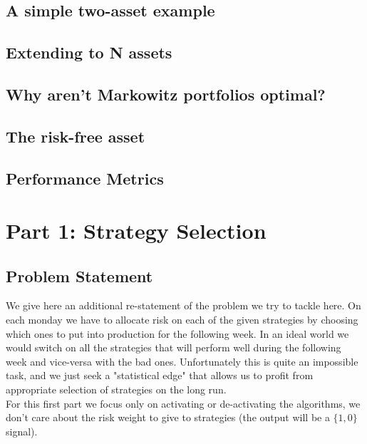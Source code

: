 \documentclass[12pt]{article} %
\numberwithin{equation}{subsection}
\begin{document}


\subsection{A simple two-asset example}



\subsection{Extending to N assets}




\subsection{Why aren't Markowitz portfolios optimal?}




\subsection{The risk-free asset}




\subsection{Performance Metrics}






\section{Part 1: Strategy Selection}

\subsection{Problem Statement}

We give here an additional re-statement of the problem we try to tackle here. On each monday we have to allocate risk on each of the given strategies by choosing which ones to put into production for the following week. In an ideal world we would switch on all the strategies that will perform well during the following week and vice-versa with the bad ones. Unfortunately this is quite an impossible task, and we just seek a "statistical edge" that allows us to profit from appropriate selection of strategies on the long run.\\
For this first part we focus only on activating or de-activating the algorithms, we don't care about the risk weight to give to strategies (the output will be a $\{1,0\}$ signal).
\end{document}
